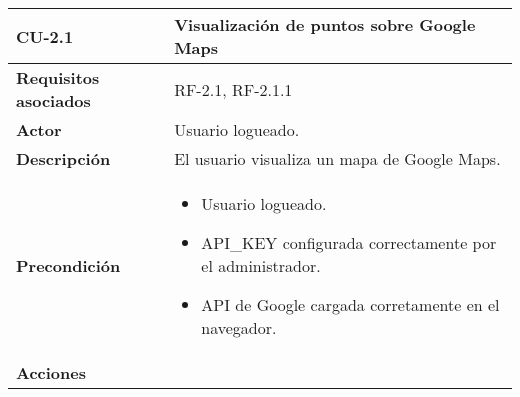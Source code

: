 \begin{longtable}[H]{@{}l|l@{}}
	\toprule
	\begin{minipage}[b]{0.23\columnwidth}\raggedright\strut
		\textbf{CU-2.1}\strut
	\end{minipage} & \begin{minipage}[b]{0.71\columnwidth}\raggedright\strut
		\textbf{Visualización de puntos sobre Google Maps}\strut
	\end{minipage}\tabularnewline
	\toprule
	\endhead
	\begin{minipage}[t]{0.23\columnwidth}\raggedright\strut
		\textbf{Requisitos asociados}\strut
	\end{minipage} & \begin{minipage}[t]{0.71\columnwidth}\raggedright\strut
		RF-2.1, RF-2.1.1\strut
	\end{minipage}\tabularnewline
	\midrule
	\begin{minipage}[t]{0.23\columnwidth}\raggedright\strut
		\textbf{Actor}\strut
	\end{minipage} & \begin{minipage}[t]{0.71\columnwidth}\raggedright\strut
		Usuario logueado.\strut
	\end{minipage}\tabularnewline
	\midrule
	\begin{minipage}[t]{0.23\columnwidth}\raggedright\strut
		\textbf{Descripción}\strut
	\end{minipage} & \begin{minipage}[t]{0.71\columnwidth}\raggedright\strut
		El usuario visualiza un mapa de Google Maps.\strut
	\end{minipage}\tabularnewline
	\midrule
	\begin{minipage}[t]{0.23\columnwidth}\raggedright\strut
		\textbf{Precondición}\strut
	\end{minipage} & \begin{minipage}[t]{0.71\columnwidth}\raggedright\strut
		\begin{itemize}
			\item Usuario logueado.
			\item API\_KEY configurada correctamente por el administrador.
			\item API de Google cargada corretamente en el navegador.
		\end{itemize}
	\end{minipage}\tabularnewline
	\midrule
	\begin{minipage}[t]{0.23\columnwidth}\raggedright\strut
		\textbf{Acciones}\strut
	\end{minipage} & \begin{minipage}[t]{0.71\columnwidth}\raggedright
		

\end{minipage}
\end{longtable}
